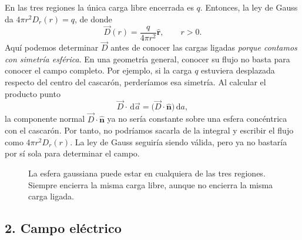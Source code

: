 \documentclass[11pt]{article}
\newcommand{\er}{\hat{\mathbf r}}
\newcommand{\normal}{\hat{\mathbf n}}
\newcommand{\dd}{\,\mathrm d}
\begin{document}
En las tres regiones la única carga libre encerrada es $q$. Entonces,
la ley de Gauss da $4\pi r^2D_r(r)=q$, de donde
\begin{equation}
  \boxed{\vec D(r)=\frac{q}{4\pi r^2}\er,\qquad r>0.}
  \label{eq:D}
\end{equation}
Aquí podemos determinar $\vec D$ antes de conocer las cargas ligadas
\emph{porque contamos con simetría esférica}. En una geometría general,
conocer su flujo no basta para conocer el campo completo.
Por ejemplo, si la carga $q$ estuviera desplazada respecto del centro
del cascarón, perderíamos esa simetría. Al calcular el producto punto
\[
  \vec D\cdot\dd\vec a
    =\bigl(\vec D\cdot\normal\bigr)\dd a,
\]
la componente normal $\vec D\cdot\normal$ ya no sería constante
sobre una esfera concéntrica con el cascarón. Por tanto, no podríamos
sacarla de la integral y escribir el flujo como $4\pi r^2D_r(r)$.
La ley de Gauss seguiría siendo válida, pero ya no bastaría por sí
sola para determinar el campo.

\begin{figure}[H]
\centering


\caption{La esfera gaussiana puede estar en cualquiera de las tres
regiones. Siempre encierra la misma carga libre, aunque no encierra
la misma carga ligada.}
\label{fig:gauss}
\end{figure}

\subsection*{2. Campo eléctrico}
\end{document}
